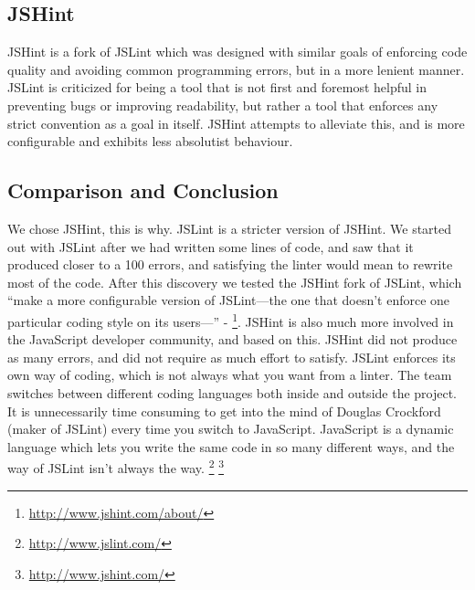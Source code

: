 \subsection*{JSHint}
JSHint is a fork of JSLint which was designed with similar goals of enforcing code quality and avoiding common programming errors, but in a more lenient manner. JSLint is criticized for being a tool that is not first and foremost helpful in preventing bugs or improving readability, but rather a tool that enforces any strict convention as a goal in itself. JSHint attempts to alleviate this, and is more configurable and exhibits less absolutist behaviour. \cite{jshint-about}

\subsection*{Comparison and Conclusion}
We chose JSHint, this is why.
JSLint is a stricter version of JSHint. We started out with JSLint after we had written some lines of code, and saw that it produced closer to a 100 errors, and satisfying the linter would mean to rewrite most of the code. After this discovery we tested the JSHint fork of JSLint, which  “make a more configurable version of JSLint—the one that doesn't enforce one particular coding style on its users—” - \footnote{\url{http://www.jshint.com/about/}}. JSHint is also much more involved in the JavaScript developer community, and based on this. JSHint did not produce as many errors, and did not require as much effort to satisfy.
JSLint enforces its own way of coding, which is not always what you want from a linter. The team switches between different coding languages both inside and outside the project. It is unnecessarily time consuming to get into the mind of Douglas Crockford (maker of JSLint) every time you switch to JavaScript. JavaScript is a dynamic language which lets you write the same code in so many different ways, and the way of JSLint isn’t always the way.
\footnote{\url{http://www.jslint.com/}}
\footnote{\url{http://www.jshint.com/}}